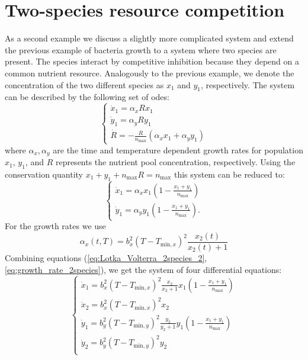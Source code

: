 \documentclass[10pt,A4paper]{article}
\begin{document}
\section*{Two-species resource competition}
As a second example we discuss a slightly more complicated system and extend the previous example of bacteria growth to a system where two species are present.
The species interact by competitive inhibition because they depend on a common nutrient resource.
Analogously to the previous example, we denote the concentration of the two different species as $x_1$ and $y_1$, respectively.
The system can be described by the following set of \acp{ode}:
\begin{equation}
    \begin{cases}
        \dot x_1 = \alpha_x R x_1 \\
        \dot y_1 = \alpha_y R y_1 \\
        \dot R = -\frac{R}{n_\text{max}}(\alpha_x x_1+\alpha_y y_1)
    \end{cases}
    \label{eq:Lotka_Volterra_2species_1}
\end{equation}
where $\alpha_x, \alpha_y$ are the time and temperature dependent growth rates for population $x_1$, $y_1$, and $R$ represents the nutrient pool concentration, respectively.
Using the conservation quantity $x_1 + y_1 + n_\text{max}R = n_\text{max}$ this system can be reduced to:
\begin{equation}
    \begin{cases}
        \dot x_1 = \alpha_x x_1\left(1-\frac{x_1+y_1}{n_\text{max}}\right) \\
        \dot y_1 = \alpha_y y_1\left(1-\frac{x_1+y_1}{n_\text{max}}\right).
    \end{cases}
    \label{eq:Lotka_Volterra_2species_2}
\end{equation}
For the growth rates we use \cite{baranyiDynamicApproach1994,?}
\begin{equation}
    \alpha_x (t, T) = b_x^2 (T - T_{\text{min}, x})^2 \frac{x_2(t)}{x_2(t) + 1}
    \label{eq:growth_rate_2species}
\end{equation}
Combining equations (\ref{eq:Lotka_Volterra_2species_2}, \ref{eq:growth_rate_2species}), we get the system of four differential equations:
\begin{equation}
    \begin{cases}
        \dot x_1 = b_x^2 (T - T_{\text{min}, x})^2 \frac{x_2}{x_2 + 1} x_1 (1 - \frac{x_1 + y_1}{n_\text{max}})\\
        \dot x_2 = b_x^2 (T - T_{\text{min}, x})^2 x_2 \\
        \dot y_1 = b_y^2 (T - T_{\text{min}, y})^2 \frac{y_2}{y_2 + 1} y_1 (1 - \frac{x_1 + y_1}{n_\text{max}})\\
        \dot y_2 = b_y^2 (T - T_{\text{min}, y})^2 y_2 \\
    \end{cases}
    \label{eq:model_2species_resource}
\end{equation}
\end{document}
